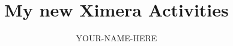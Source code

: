 \documentclass{xourse}
\title{My new Ximera Activities}
\author{YOUR-NAME-HERE}
\begin{document}
\begin{abstract}
\end{abstract}
\maketitle
\end{document}
